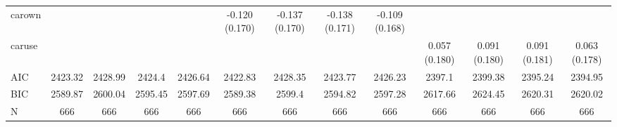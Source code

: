 \begin{table}[!htbp]
\begin{tabular}{lcccccccccccc}
carown &  &  &  &  & -0.120 (0.170) & -0.137 (0.170) & -0.138 (0.171) & -0.109 (0.168) &  &  &  &  \\
caruse &  &  &  &  &  &  &  &  & 0.057 (0.180) & 0.091 (0.180) & 0.091 (0.181) & 0.063 (0.178) \\
AIC & 2423.32 & 2428.99 & 2424.4 & 2426.64 & 2422.83 & 2428.35 & 2423.77 & 2426.23 & 2397.1 & 2399.38 & 2395.24 & 2394.95 \\
BIC & 2589.87 & 2600.04 & 2595.45 & 2597.69 & 2589.38 & 2599.4 & 2594.82 & 2597.28 & 2617.66 & 2624.45 & 2620.31 & 2620.02 \\
N & 666 & 666 & 666 & 666 & 666 & 666 & 666 & 666 & 666 & 666 & 666 & 666 \\
\hline
\end{tabular}
\end{table}
